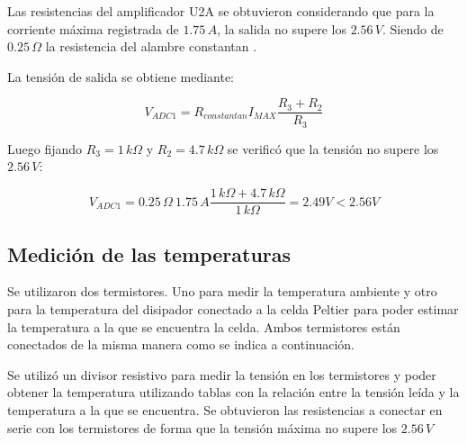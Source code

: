 \documentclass[10pt,spanish,a4paper,openany,notitlepage]{article}
\begin{document}
Las resistencias del amplificador U2A se obtuvieron considerando que para
la corriente máxima registrada de $1.75\, \unit{A}$, la salida no supere los $2.56\, \unit{V}$.
Siendo de  $0.25\, \unit{\Omega}$ la resistencia del alambre constantan .

La tensión de salida se obtiene mediante:

\begin{equation}
V_{ADC1} = R_{constantan} I_{MAX} \frac{R_3 + R_2}{R_3}
\label{eq:tension_salida}
\end{equation}

Luego fijando $R_3 = 1\, \unit{k\Omega}$ y $R_2 = 4.7\, \unit{k\Omega}$
se verificó que la tensión no supere los $2.56\, \unit{V}$:

\[ \displaystyle V_{ADC1} = 0.25\, \unit{\Omega}\ 1.75\, \unit{A} \frac{1\, \unit{k\Omega} + 4.7\, \unit{k\Omega}}{1\, \unit{k\Omega}} = 2.49 \unit{V} < 2.56 \unit{V} \]

\subsection{Medición de las temperaturas}

Se utilizaron dos termistores. Uno para medir la temperatura ambiente y 
otro para la temperatura del disipador conectado a la celda Peltier para
poder estimar la temperatura a la que se encuentra la celda.
Ambos termistores están conectados de la misma manera como se indica a continuación.

Se utilizó un divisor resistivo para medir la tensión en los termistores y 
poder obtener la temperatura utilizando tablas con la relación entre
la tensión leída y la temperatura a la que se encuentra.
Se obtuvieron las resistencias a conectar en serie con los termistores de
forma que la tensión máxima no supere los $2.56\, \unit{V}$
\end{document}
